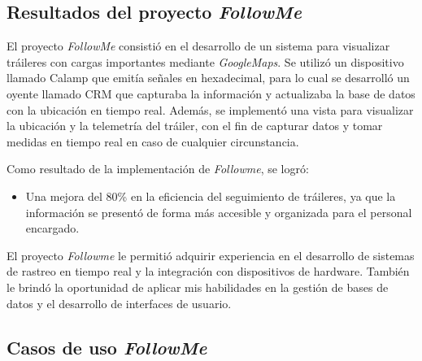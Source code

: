 \documentclass[protocolo.tex]{subfiles}
\begin{document}
\subsection{Resultados del proyecto \textit{FollowMe}}

El proyecto \textit{FollowMe} consistió en el desarrollo de un sistema para visualizar tráileres con cargas importantes mediante \textit{GoogleMaps}.  Se utilizó un dispositivo llamado Calamp que emitía señales en hexadecimal, para lo cual se desarrolló un oyente llamado CRM que capturaba la información y  actualizaba la base de datos con la ubicación en tiempo real.  Además, se implementó una vista para visualizar la ubicación y la telemetría del tráiler, con el fin de capturar datos y tomar medidas en tiempo real en caso de cualquier circunstancia.\vspace{4mm}

Como resultado de la implementación de \textit{Followme}, se logró:

\begin{itemize}
\item Una mejora del 80\% en la eficiencia del seguimiento de tráileres, ya que la información se  presentó  de forma más accesible y organizada para el personal encargado.
\end{itemize}

El proyecto \textit{Followme} le permitió adquirir experiencia en el desarrollo de sistemas de rastreo en tiempo real y la integración con dispositivos de hardware.  También le brindó la oportunidad de aplicar mis habilidades en la gestión de bases de datos y el desarrollo de interfaces de usuario.

\subsection{Casos de uso \textit{FollowMe}} 
\end{document}
